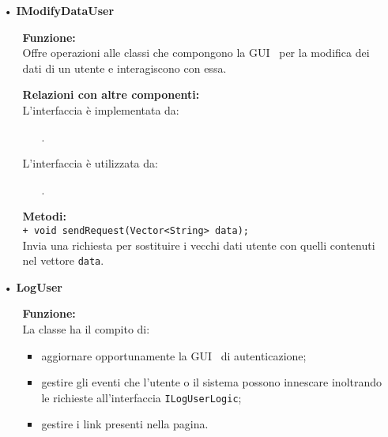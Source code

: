 {\begin{sloppypar}
{\begin{itemize}
\begin{itemize}
			\item[] \textbf{Metodi:}\\
				\texttt{+ void dataRequest();}\\
				Invia una richiesta al Presenter per recuperare i dati relativi all’utente.\\
		\end{itemize}

		\item[•] \textbf{IModifyDataUser}
		\begin{itemize}
			\item[] \textbf{Funzione:}\\
				  Offre operazioni alle classi che compongono la GUI\g~ per la modifica dei dati di un utente e interagiscono con essa.\\
				
			\item[] \textbf{Relazioni con altre componenti:}\\
				L'interfaccia è implementata da:
				\begin{itemize}
					\item[] . 
				\end{itemize}
				L'interfaccia è utilizzata da:
				\begin{itemize}
					\item[] . 
				\end{itemize}
				
			\item[] \textbf{Metodi:}\\
				\texttt{+ void sendRequest(Vector<String> data);}\\
				Invia una richiesta per sostituire i vecchi dati utente con quelli contenuti nel vettore \texttt{data}.\\
		\end{itemize}
		
		\item[•] \textbf{LogUser}
		\begin{itemize}
			\item[] \textbf{Funzione:}\\
				  La classe ha il compito di:
				\begin{itemize}
					\item aggiornare opportunamente la GUI\g~ di autenticazione;
					\item gestire gli eventi che l’utente o il sistema possono innescare inoltrando le richieste all'interfaccia \texttt{ILogUserLogic};
					\item gestire i link presenti nella pagina.
				\end{itemize}
				

\end{itemize}
\end{itemize}}
\end{sloppypar}}
